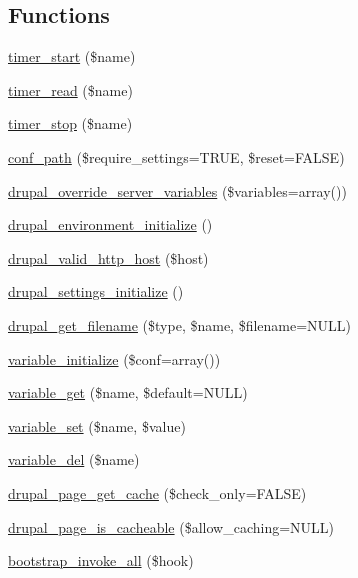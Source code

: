 \subsection*{Functions}
\begin{DoxyCompactItemize}
\item 
\hyperlink{bootstrap_8inc_a0aaa023d3c72be50ab4ac3f7e1c989c0}{timer\_\-start} (\$name)
\item 
\hyperlink{bootstrap_8inc_ad093007ebd04feb2a1394ff5774eb6d4}{timer\_\-read} (\$name)
\item 
\hyperlink{bootstrap_8inc_a8cb56b8962398895710c35a3584a7d11}{timer\_\-stop} (\$name)
\item 
\hyperlink{bootstrap_8inc_acef612ef19c49f6259531f0bee5c26cc}{conf\_\-path} (\$require\_\-settings=TRUE, \$reset=FALSE)
\item 
\hyperlink{bootstrap_8inc_ae40262dd353ec3d0fada2e2d2d44a8ef}{drupal\_\-override\_\-server\_\-variables} (\$variables=array())
\item 
\hyperlink{bootstrap_8inc_a14319f2e33c7996576b203ed2bae9b62}{drupal\_\-environment\_\-initialize} ()
\item 
\hyperlink{bootstrap_8inc_ae65d9d5f6c34309eb884e51fd39ffb6d}{drupal\_\-valid\_\-http\_\-host} (\$host)
\item 
\hyperlink{bootstrap_8inc_acae9a8501a2571219d7517f50cc6afec}{drupal\_\-settings\_\-initialize} ()
\item 
\hyperlink{bootstrap_8inc_ae2af73b6b16cc9d723e931748aa6c853}{drupal\_\-get\_\-filename} (\$type, \$name, \$filename=NULL)
\item 
\hyperlink{bootstrap_8inc_a7cb710899d7238be1cad274e278cd87f}{variable\_\-initialize} (\$conf=array())
\item 
\hyperlink{bootstrap_8inc_a1be2160d5e5a1a9b9a0c90944c4f5252}{variable\_\-get} (\$name, \$default=NULL)
\item 
\hyperlink{bootstrap_8inc_a9859faa6fcd56ca6048be93dace95999}{variable\_\-set} (\$name, \$value)
\item 
\hyperlink{bootstrap_8inc_a7850bff5f313f85335f418e6d87606b1}{variable\_\-del} (\$name)
\item 
\hyperlink{bootstrap_8inc_ae0a2f358a39764e08d16be76415b367f}{drupal\_\-page\_\-get\_\-cache} (\$check\_\-only=FALSE)
\item 
\hyperlink{bootstrap_8inc_a7972b6ea362a180e975d1d531a18996a}{drupal\_\-page\_\-is\_\-cacheable} (\$allow\_\-caching=NULL)
\item 
\hyperlink{bootstrap_8inc_a3f13159d2e93ecfd09823d8dca30f5d9}{bootstrap\_\-invoke\_\-all} (\$hook)

\end{DoxyCompactItemize}

